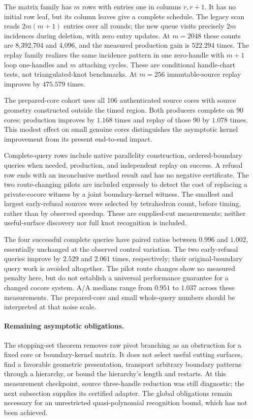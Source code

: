 The matrix family has $m$ rows with entries one in columns $r,r+1$.
It has no initial row leaf, but its column leaves give a complete schedule.
The legacy scan reads $2m(m+1)$ entries over all rounds; the new queue
visits precisely $2m$ incidences during deletion, with zero entry updates.
At $m=2048$ these counts are 8,392,704 and 4,096, and the measured production
gain is $522.294$ times. The replay family realizes the same incidence
pattern in one zero-handle with $m+1$ loop one-handles and $m$ attaching
cycles. These are conditional handle-chart tests, not triangulated-knot
benchmarks. At $m=256$ immutable-source replay improves by $475.579$ times.

The prepared-core cohort uses all 106 authenticated source cores with source
geometry constructed outside the timed region. Both producers complete on
90 cores; production improves by $1.168$ times and replay of those 90 by
$1.078$ times. This modest effect on small genuine cores distinguishes the
asymptotic kernel improvement from its present end-to-end impact.



Complete-query rows include native parallelity construction, ordered-boundary
queries when needed, production, and independent replay on success. A refusal
row ends with an inconclusive method result and has no negative certificate.
The two route-changing pilots are included expressly to detect the cost of
replacing a private-cocore witness by a joint boundary-kernel witness. The
smallest and largest early-refusal sources were selected by tetrahedron
count, before timing, rather than by observed speedup. These are supplied-cut
measurements; neither useful-surface discovery nor full knot recognition is
included.


The four successful complete queries have paired ratios between $0.996$
and $1.002$, essentially unchanged at the observed control variation. The
two early-refusal queries improve by $2.529$ and $2.061$ times, respectively;
their original-boundary query work is avoided altogether. The pilot route
changes show no measured penalty here, but do not establish a universal
performance guarantee for a changed cocore system. A/A medians range from
$0.951$ to $1.037$ across these measurements. The prepared-core and small
whole-query numbers should be interpreted at that noise scale.

\paragraph{Remaining asymptotic obligations.}
The stopping-set theorem removes raw pivot branching as an obstruction for a
fixed core or boundary-kernel matrix. It does not select useful cutting
surfaces, find a favorable geometric presentation, transport arbitrary
boundary patterns through a hierarchy, or bound the hierarchy's length and
restarts. At this measurement checkpoint, source three-handle reduction was still
diagnostic; the next subsection supplies its certified adapter. The global
obligations remain necessary for an unrestricted
quasi-polynomial recognition bound, which has not been achieved.
